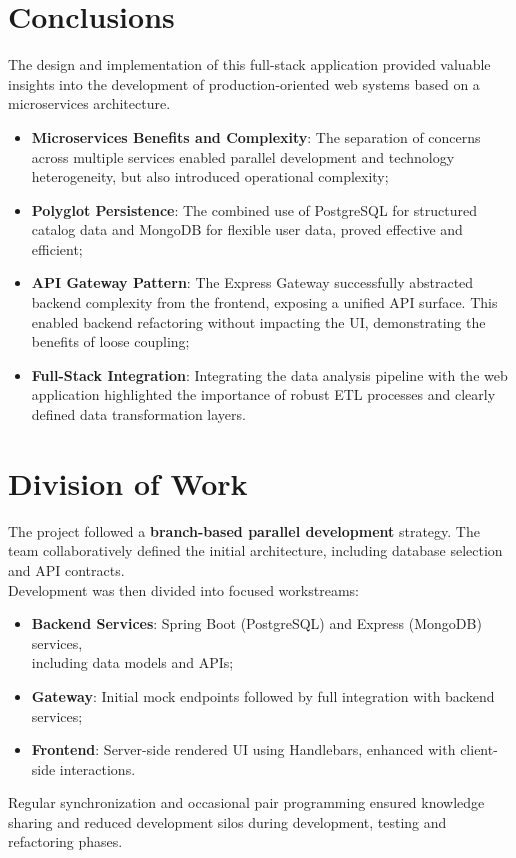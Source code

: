 \documentclass[11pt,a4paper]{article}
\begin{document}
\newpage
\section{Conclusions}
The design and implementation of this full-stack application provided valuable insights into the development of production-oriented web systems based on a microservices architecture.
\begin{itemize}
    \item \textbf{Microservices Benefits and Complexity}: The separation of concerns across multiple services enabled parallel development and technology heterogeneity, but also introduced operational complexity;
    \item \textbf{Polyglot Persistence}: The combined use of PostgreSQL for structured catalog data and MongoDB for flexible user data, proved effective and efficient;
    \item \textbf{API Gateway Pattern}: The Express Gateway successfully abstracted backend complexity from the frontend, exposing a unified API surface. This enabled backend refactoring without impacting the UI, demonstrating the benefits of loose coupling;
    \item \textbf{Full-Stack Integration}: Integrating the data analysis pipeline with the web application highlighted the importance of robust ETL processes and clearly defined data transformation layers.
\end{itemize}

\section{Division of Work}
The project followed a \textbf{branch-based parallel development} strategy. The team collaboratively defined the initial architecture, including database selection and API contracts. \\Development was then divided into focused workstreams:
\begin{itemize}
    \item \textbf{Backend Services}: Spring Boot (PostgreSQL) and Express (MongoDB) services,\\ including data models and APIs;
    \item \textbf{Gateway}: Initial mock endpoints followed by full integration with backend services;
    \item \textbf{Frontend}: Server-side rendered UI using Handlebars, enhanced with client-side interactions.
\end{itemize}
Regular synchronization and occasional pair programming ensured knowledge sharing and reduced development silos during development, testing and refactoring phases.
\end{document}
